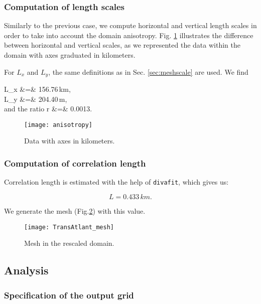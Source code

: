 \subsubsection{Computation of length scales}

Similarly to the previous case, we compute horizontal and vertical length scales in order to take into account the domain anisotropy. Fig. \ref{fig:anisotropy} illustrates the difference between horizontal and vertical scales, as we represented the data within the domain with axes graduated in kilometers.

For $L_x$ and $L_y$, the same definitions as in Sec. \ref{sec:meshscale} are used. We find

\beqn
L_x &=& 156.76\,km, \\
L_y &=& 204.40\,m, \\
\textrm{and the ratio\qquad} r &=&  0.0013.
\eeqn

\begin{figure}[htpb]
\centering
\texttt{[image: anisotropy]}
\caption{Data with axes in kilometers.\label{fig:anisotropy}}
\end{figure}



\subsubsection{Computation of correlation length}

Correlation length is estimated with the help of \texttt{divafit}, which gives us:

\[L=0.433\,km.\]

We generate the mesh (Fig.\ref{fig:trans_mesh}) with this value.

\begin{figure}[H]
\centering
\texttt{[image: TransAtlant\_mesh]}
\caption{Mesh in the rescaled domain.\label{fig:trans_mesh}}
\end{figure}



\subsection{Analysis}

\subsubsection{Specification of the output grid}

